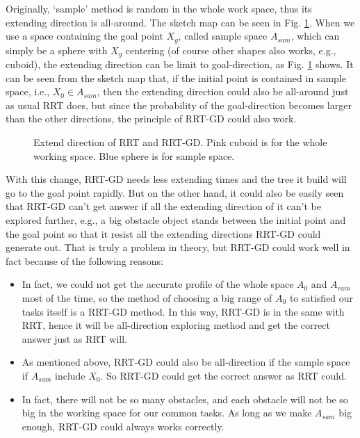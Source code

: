 \documentclass[letterpaper, 10 pt, conference]{ieeeconf}  %
\begin{document}
Originally, `sample' method is random in the whole work space, thus its extending direction is all-around. The sketch map can be seen in Fig. \ref{fig_sketch}. When we use a space containing the goal point $X_{g}$, called sample space $A_{sam}$, which can simply be a sphere with $X_{g}$ centering (of course other shapes also works, e.g., cuboid), the extending direction can be limit to goal-direction, as Fig. \ref{fig_sketch} shows. It can be seen from the sketch map that, if the initial point is contained in sample space, i.e., $X_{0}\in A_{sam}$, then the extending direction could also be all-around just as usual RRT does, but since the probability of the goal-direction becomes larger than the other directions, the principle of RRT-GD could also work.

\begin{figure}[thpb]
      \centering
      \caption{Extend direction of RRT and RRT-GD. Pink cuboid is for the whole working space. Blue sphere is for sample space. }
      \label{fig_sketch}
\end{figure}

With this change, RRT-GD needs less extending times and the tree it build will go to the goal point rapidly. But on the other hand, it could also be easily seen that RRT-GD can't get answer if all the extending direction of it can't be explored further, e.g., a big obstacle object stands between the initial point and the goal point so that it resist all the extending directions RRT-GD could generate out. That is truly a problem in theory, but RRT-GD could work well in fact because of the following reasons:

\begin{itemize}

\item In fact, we could not get the accurate profile of the whole space $A_{0}$ and $A_{ram}$ most of the time, so the method of choosing a big range of $A_{0}$ to satisfied our tasks itself is a RRT-GD method. In this way, RRT-GD is in the same with RRT, hence it will be all-direction exploring method and get the correct answer just as RRT will.
\item  As mentioned above, RRT-GD could also be all-direction if the sample space if $A_{sam}$ include $X_{0}$. So RRT-GD could get the correct answer as RRT could.
\item In fact, there will not be so many obstacles, and each obstacle will not be so big in the working space for our common tasks. As long as we make $A_{sam}$ big enough, RRT-GD could always works correctly.  

\end{itemize} 
\end{document}
